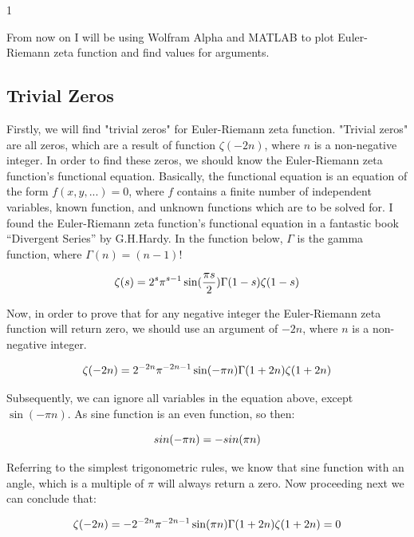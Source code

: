 1\documentclass[a4paper]{article}
\begin{document}
From now on I will be using Wolfram Alpha and MATLAB to plot Euler-Riemann zeta function
and find values for arguments.\\

\subsection{Trivial Zeros}

Firstly, we will find "trivial zeros" for Euler-Riemann zeta function. "Trivial zeros" are all zeros,
which are a result of function $\zeta(-2n)$, where $n$ is a non-negative integer. In order to find these
zeros, we should know the Euler-Riemann zeta function's functional equation. Basically, the
functional equation \cite{Func}
is an equation of the form $f(x, y, ... ) = 0$, where $f$ contains a finite number
of independent variables, known function, and unknown functions which are to be solved for. I
found the Euler-Riemann zeta function's functional equation in a fantastic book
“Divergent Series” by G.H.Hardy.\cite{Hardy}
In the function below, $\Gamma$ is the gamma function, where $\Gamma(n) = (n-1)!$

\begin{equation}
  \zeta(s)=2^s\pi^{s-1}\sin(\frac{\pi s}{2})\Gamma(1-s)\zeta(1-s)\\
  \end{equation}

Now, in order to prove that for any negative integer the Euler-Riemann zeta function will return
zero, we should use an argument of $-2n$, where $n$ is a non-negative integer.

\begin{equation}
  \zeta(-2n)=2^{-2n}\pi^{-2n-1}\sin(-\pi n)\Gamma(1+2n)\zeta(1+2n)\\
  \end{equation}

Subsequently, we can ignore all variables in the equation above, except $\sin(-\pi n)$. As sine
function is an even function, so then:

\begin{equation}
  sin(-\pi n)=-sin(\pi n)\\
  \end{equation}

Referring to the simplest trigonometric rules, we know that sine function with an angle, which is a
multiple of $\pi$ will always return a zero. Now proceeding next we can conclude that:

\begin{equation*}
  \zeta(-2n)=-2^{-2n}\pi^{-2n-1}\sin(\pi n)\Gamma(1+2n)\zeta(1+2n)=0\\
  \end{equation*}
\end{document}

